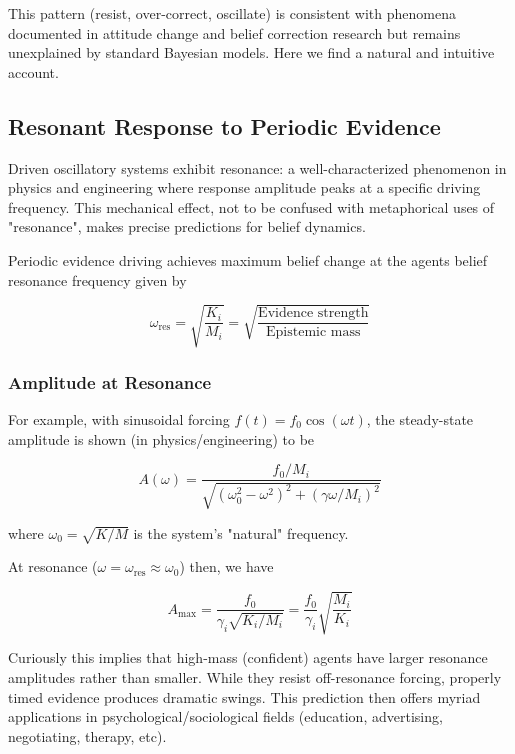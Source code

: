 \documentclass[12pt]{article}
\begin{document}
This pattern (resist, over-correct, oscillate) is consistent with phenomena documented in attitude change and belief correction research \citep{Eagly1993, Lewandowsky2012} but remains unexplained by standard Bayesian models. Here we find a natural and intuitive account.

\subsection{Resonant Response to Periodic Evidence}

Driven oscillatory systems exhibit resonance: a well-characterized phenomenon 
in physics and engineering where response amplitude peaks at a specific driving 
frequency. This mechanical effect, not to be confused with metaphorical uses of 
"resonance", makes precise predictions for belief dynamics.

Periodic evidence driving achieves maximum belief change at the agents belief resonance frequency given by

\begin{equation}
\boxed{\omega_{\text{res}} = \sqrt{\frac{K_i}{M_i}} = \sqrt{\frac{\text{Evidence strength}}{\text{Epistemic mass}}}}
\end{equation}


\subsubsection{Amplitude at Resonance}

For example, with sinusoidal forcing $f(t) = f_0\cos(\omega t)$, the steady-state amplitude is shown (in physics/engineering) to be

\begin{equation}
A(\omega) = \frac{f_0/M_i}{\sqrt{(\omega_0^2 - \omega^2)^2 + (\gamma\omega/M_i)^2}}
\end{equation}

where $\omega_0 = \sqrt{K/M}$ is the system's "natural" frequency.

At resonance ($\omega = \omega_{\text{res}} \approx \omega_0$) then, we have

\begin{equation}
A_{\text{max}} = \frac{f_0}{\gamma_i \sqrt{K_i/M_i}} = \frac{f_0}{\gamma_i}\sqrt{\frac{M_i}{K_i}}
\end{equation}

Curiously this implies that high-mass (confident) agents have larger resonance amplitudes rather than smaller. While they resist off-resonance forcing, properly timed evidence produces dramatic swings. This prediction then offers myriad applications in psychological/sociological fields (education, advertising, negotiating, therapy, etc).
\end{document}
